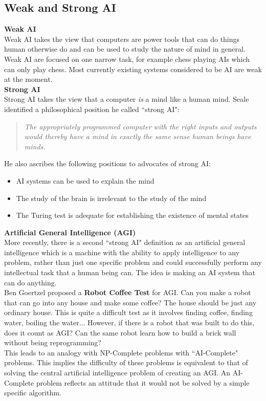 \documentclass{article}
\newcommand{\n}[0]{\\[\baselineskip]}
\begin{document}
\subsection{Weak and Strong AI}
\textbf{Weak AI} \\
Weak AI takes the view that computers are power tools that can do things human otherwise do and can be used to study the nature of mind in general. Weak AI are focused on one narrow task, for example chess playing AIs which can only play chess. Most currently existing systems considered to be AI are weak at the moment.
\n
\textbf{Strong AI} \\
Strong AI takes the view that a computer \textit{is} a mind like a human mind. Seale identified a philosophical position he called ``strong AI":
\begin{quote}
\textit{The appropriately programmed computer with the right inputs and outputs would thereby have a mind in exactly the same sense human beings have minds.}
\end{quote}
He also ascribes the following positions to advocates of strong AI:
\begin{itemize}
\item AI systems can be used to explain the mind
\item The study of the brain is irrelevant to the study of the mind
\item The Turing test is adequate for establishing the existence of mental states
\end{itemize}
\textbf{Artificial General Intelligence (AGI)} \\
More recently, there is a second ``strong AI" definition as an artificial general intelligence which is a machine with the ability to apply intelligence to any problem, rather than just one specific problem and could successfully perform any intellectual task that a human being can. The idea is making an AI system that can do anything.
\n
Ben Goertzel proposed a \textbf{Robot Coffee Test} for AGI. Can you make a robot that can go into any house and make some coffee? The house should be just any ordinary house. This is quite a difficult test as it involves finding coffee, finding water, boiling the water... However, if there is a robot that was built to do this, does it count as AGI? Can the same robot learn how to build a brick wall without being reprogramming?
\n
This leads to an analogy with NP-Complete problems with ``AI-Complete" problems. This implies the difficulty of these problems is equivalent to that of solving the central artificial intelligence problem of creating an AGI. An AI-Complete problem reflects an attitude that it would not be solved by a simple specific algorithm.
\end{document}
